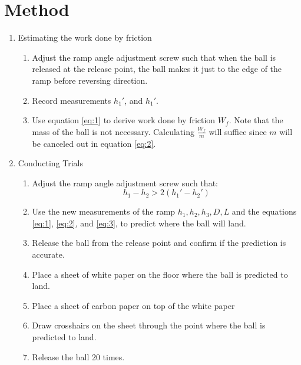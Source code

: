 \documentclass{article}
\begin{document}

\section{Method}
\begin{enumerate}

    \item Estimating the work done by friction 
        \begin{enumerate}
            \item Adjust the ramp angle adjustment screw such that when the ball is released at the release point, the ball makes it just to the edge of the ramp before reversing direction.
            \item Record measurements $h_{1}\ensuremath{'}$, and $h_{1}\ensuremath{'}$.
            \item Use equation \eqref{eq:1} to derive work done by friction $W_{f}$. Note that the mass of the ball is not necessary. Calculating $\frac{W_{f}}{m}$ will suffice since $m$ will be canceled out in equation \eqref{eq:2}.
        \end{enumerate}

    \item Conducting Trials
        \begin{enumerate}
            \item Adjust the ramp angle adjustment screw such that: \\
                \begin{equation} h_{1} - h_{2} > 2(h_{1}\ensuremath{'} - h_{2}\ensuremath{'}) \end{equation}
            \item Use the new measurements of the ramp $h_{1}, h_{2}, h_{3}, D, L$ and the equations \eqref{eq:1}, \eqref{eq:2}, and \eqref{eq:3}, to predict where the ball will land. 
            \item Release the ball from the release point and confirm if the prediction is accurate.
            \item Place a sheet of white paper on the floor where the ball is predicted to land.
            \item Place a sheet of carbon paper on top of the white paper
            \item Draw crosshairs on the sheet through the point where the ball is predicted to land.
            \item Release the ball 20 times.



\end{enumerate}
\end{enumerate}
\end{document}
